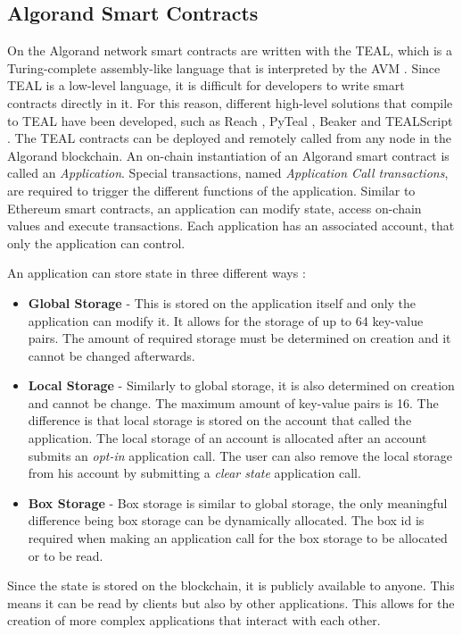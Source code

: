 \subsection*{Algorand Smart Contracts} \label{section:algorand-smartcontracts}
On the Algorand network smart contracts are written with the \ac{TEAL}, which is a Turing-complete assembly-like language that is interpreted by the \ac{AVM} \cite{noauthor_introduction_nodate}.
Since \ac{TEAL} is a low-level language, it is difficult for developers to write smart contracts directly in it.
For this reason, different high-level solutions that compile to \ac{TEAL} have been developed, such as Reach \cite{noauthor_reach_nodate}, PyTeal \cite{noauthor_pyteal_nodate}, Beaker \cite{noauthor_beaker_nodate} and TEALScript \cite{noauthor_algorandfoundationtealscript_nodate}.
The \ac{TEAL} contracts can be deployed and remotely called from any node in the Algorand blockchain. An on-chain instantiation of an Algorand smart contract is called an \textit{Application}. Special transactions, named \textit{Application Call transactions}, are required to trigger the different functions of the application. Similar to Ethereum smart contracts, an application can modify state, access on-chain values and execute transactions. Each application has an associated account, that only the application can control.

An application can store state in three different ways \cite{noauthor_contract_nodate}:
\begin{itemize}
    \item \textbf{Global Storage} - This is stored on the application itself and only the application can modify it. It allows for the storage of up to 64 key-value pairs. The amount of required storage must be determined on creation and it cannot be changed afterwards.
    \item \textbf{Local Storage} - Similarly to global storage, it is also determined on creation and cannot be change. The maximum amount of key-value pairs is 16. The difference is that local storage is stored on the account that called the application. The local storage of an account is allocated after an account submits an \textit{opt-in} application call. The user can also remove the local storage from his account by submitting a \textit{clear state} application call.
    \item \textbf{Box Storage} - Box storage is similar to global storage, the only meaningful difference being box storage can be dynamically allocated. The box id is required when making an application call for the box storage to be allocated or to be read.
\end{itemize}
Since the state is stored on the blockchain, it is publicly available to anyone. This means it can be read by clients but also by other applications. This allows for the creation of more complex applications that interact with each other.

